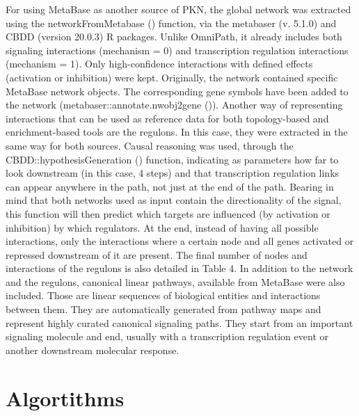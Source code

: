 For using MetaBase as another source of PKN, the global network was extracted using the networkFromMetabase () function, via the metabaser (v. 5.1.0) and CBDD (version 20.0.3) R packages. 
Unlike OmniPath, it already includes both signaling interactions (mechanism = 0) and transcription regulation interactions (mechanism = 1). Only high-confidence interactions with defined effects (activation or inhibition) were kept. 
Originally, the network contained specific MetaBase network objects. The corresponding gene symbols have been added to the network (metabaser::annotate.nwobj2gene ()).
Another way of representing interactions that can be used as reference data for both topology-based and enrichment-based tools are the regulons. In this case, they were extracted in the same way for both sources. Causal reasoning was used, through the CBDD::hypothesisGeneration () function, indicating as parameters how far to look downstream (in this case, 4 steps) and that transcription regulation links can appear anywhere in the path, not just at the end of the path. Bearing in mind that both networks used as input contain the directionality of the signal, this function will then predict which targets are influenced (by activation or inhibition) by which regulators. At the end, instead of having all possible interactions, only the interactions where a certain node and all genes activated or repressed downstream of it are present. The final number of nodes and interactions of the regulons is also detailed in Table 4. In addition to the network and the regulons, canonical linear pathways, available from MetaBase were also included. Those are linear sequences of biological entities and interactions between them. They are automatically generated from pathway maps and represent highly curated canonical signaling paths. They start from an important signaling molecule and end, usually with a transcription regulation event or another downstream molecular response. 

\section{Algortithms} %
\label{sec:algorithms}

